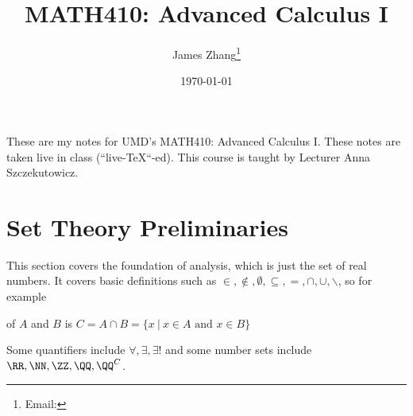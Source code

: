\documentclass[12pt]{scrartcl}
\begin{document}
\title{MATH410: Advanced Calculus I}
\author{James Zhang\thanks{Email: }}
\date{\today}



\maketitle
    These are my notes for UMD's MATH410: Advanced Calculus I. 
    These notes are taken live in class (``live-\TeX``-ed).
    This course is taught by Lecturer Anna Szczekutowicz. 
\tableofcontents
\newpage

\section{Set Theory Preliminaries}

This section covers the foundation of analysis, which is just the set of real numbers. 
It covers basic definitions such as $\in, \notin, \emptyset, \subseteq, =, \cap, \cup, \backslash$, so for example

\begin{definition}
   of $A$ and $B$ is $C= A \cap B = \{x \ | \ x \in A \text{ and } x \in B\}$
\end{definition}

Some quantifiers include $\forall, \exists, \exists!$ and some number sets include $\RR, \NN, \ZZ, \QQ, \QQ^C$. 
\end{document}
